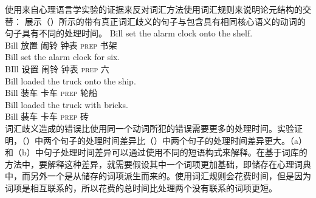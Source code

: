 \begin{exe}
\begin{xlist}[iv.]
\begin{exe}
\begin{xlist}[iv.]
\citet[\S~1.4.5]{Goldberg95a}使用来自心理语言学实验的证据来反对词汇方法使用词汇规则来说明论元结构的交替： \citet{CT88a}展示（）所示的带有真正词汇歧义的句子与包含具有相同核心语义的动词的句子具有不同的处理时间。
\eal
\ex
\gll Bill set the alarm clock onto the shelf.\\
     Bill 放置  闹铃 钟表 \textsc{prep}  书架\\
\ex
\gll Bill set the alarm clock for six.\\
     BIll 设置  闹铃 钟表 \textsc{prep} 六\\
\zl
\eal
\ex
\gll Bill loaded the truck onto the ship.\\
     Bill 装车  卡车 \textsc{prep}  轮船\\
\ex
\gll Bill loaded the truck with bricks.\\
     Bill 装车  卡车 \textsc{prep} 砖\\
\zl
词汇歧义造成的错误比使用同一个动词所犯的错误需要更多的处理时间。实验证明，（）中两个句子的处理时间差异比（）中两个句子的处理时间差异更大。（a）和（b）中句子处理时间差异可以通过使用不同的短语构式来解释。在基于词库的方法中，要解释这种差异，就需要假设其中一个词项更加基础，即储存在心理词典中，而另外一个是从储存的词项派生而来的。使用词汇规则会花费时间，但是因为词项是相互联系的，所以花费的总时间比处理两个没有联系的词项更短\citep[]{Mueller2002b}。


\end{xlist}
\end{exe}
\end{xlist}
\end{exe}
